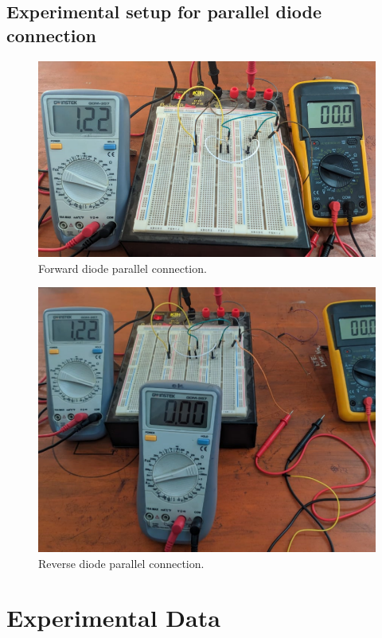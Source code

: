 \subsection{Experimental setup for parallel diode connection}
\begin{figure}[H]
    \centering
    \includegraphics[scale=0.3]{src/exp03/par1.png}
    \caption{Forward diode parallel connection.}
\end{figure}

\begin{figure}[H]
    \centering
    \includegraphics[scale=0.3]{src/exp03/par2.png}
    \caption{Reverse diode parallel connection.}
\end{figure}

\section{Experimental Data}

